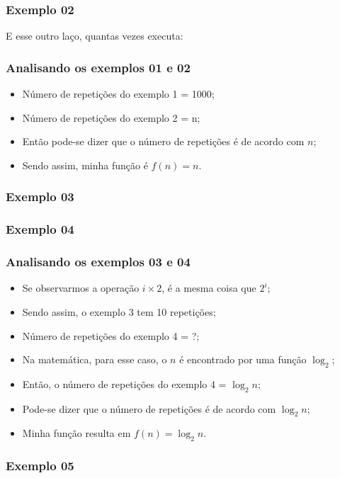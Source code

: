 \documentclass{beamer}
\begin{document}
\begin{frame}
	\frametitle{Exemplo 02}
    E esse outro laço, quantas vezes executa:
    
\end{frame}

\begin{frame}
	\frametitle{Analisando os exemplos 01 e 02}
    \begin{itemize}[<+->]
        \item Número de repetições do exemplo 1 = 1000;
        \item Número de repetições do exemplo 2 = n;
        \item Então pode-se dizer que o número de repetições é de acordo com $n$;
        \item Sendo assim, minha função é $f(n) = n$.
    \end{itemize}
\end{frame}

\begin{frame}
	\frametitle{Exemplo 03}
    
\end{frame}

\begin{frame}
	\frametitle{Exemplo 04}
    
\end{frame}

\begin{frame}
	\frametitle{Analisando os exemplos 03 e 04}
    \begin{itemize}[<+->]
        \item Se observarmos a operação $i \times 2$, é a mesma coisa que $2^i$;
        \item Sendo assim, o exemplo 3 tem 10 repetições;
        \item Número de repetições do exemplo 4 = ?;
        \item Na matemática, para esse caso, o $n$ é encontrado por uma função $\log_2$;
        \item Então, o número de repetições do exemplo 4 = $\log_2 n$;
        \item Pode-se dizer que o número de repetições é de acordo com $\log_2 n$;
        \item Minha função resulta em $f(n) = \log_2 n$.
    \end{itemize}
\end{frame}

\begin{frame}
	\frametitle{Exemplo 05}
    
\end{frame}
\end{document}
